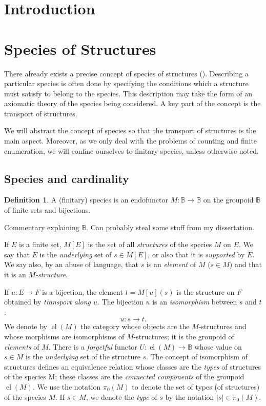 \documentclass{article}
\theoremstyle{definition}
\newtheorem{defn}[thm]{Definition}
\theoremstyle{remark}
\newcommand{\B}{\mathbb{B}}
\DeclareMathOperator{\el}{el}
\newcommand{\term}[1]{\emph{#1}}
\begin{document}
\section{Introduction}
\label{sec:introduction}


\section{Species of Structures}
\label{sec:species-of-structures}

There already exists a precise concept of species of structures (). Describing a particular species is often done by specifying the
conditions which a structure must satisfy to belong to the species.
This description may take the form of an axiomatic theory of the species
being considered. A key part of the concept is the transport of structures.

We will abstract the concept of species so that the transport of
structures is the main aspect. Moreover, as we only deal
with the problems of counting and finite enumeration, we will confine ourselves
to finitary species, unless otherwise noted.

\subsection{Species and cardinality}
\label{sec:species-and-cardinality}

\begin{defn}
  A (finitary) species is an endofunctor $M: \B \to \B$
  on the groupoid $\B$ of finite sets and bijections.
\end{defn}

\begin{commentary}
  Commentary explaining $\B$.  Can probably steal some stuff from my
  dissertation.
\end{commentary}

If $E$ is a finite set, $M [E]$ is the set of all \term{structures}
of the species $M$ on $E$. We say that $E$ is the \term{underlying} set of
$s \in M[E]$, or also that it is \term{supported} by $E$. We say
also, by an abuse of language, that $s$ is an \term{element} of $M$ ($s \in M$) and that it is an
\term{$M$-structure}.

If $u: E \to F$ is a bijection, the element $t = M [u] (s)$ is the structure on $F$
obtained by \term{transport along $u$}. The bijection $u$ is an \term{isomorphism}
between $s$ and $t$:
\[ u : s \to t. \]
We denote by $\el (M)$ the category whose objects are the $M$-structures and
whose morphisms are isomorphisms of $M$-structures; it is the
groupoid of \term{elements} of $M$. There is a \term{forgetful}
functor $U: \el (M) \to \B$ whose
value on $s \in M$ is the \term{underlying} set of the structure $s$. The concept
of isomorphism of structures defines an equivalence relation whose
classes are the \term{types} of structures of the species M; these classes are
the \term{connected components} of the groupoid $\el (M)$. We use the notation
$\pi_0 (M)$ to denote the set of types (of structures) of the species $M$. If
$s \in M$, we denote the \term{type} of $s$ by the notation $|s| \in \pi_0 (M)$.
\end{document}
